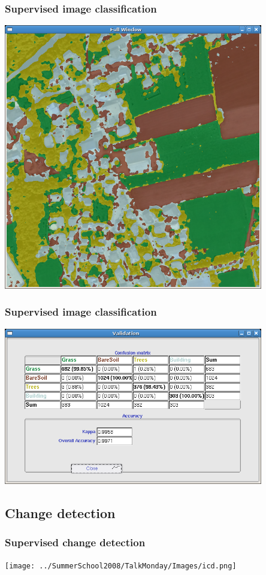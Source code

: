 \documentclass[compress]{beamer}
\begin{document}
\begin{frame}
  \frametitle{Supervised image classification}
      \begin{center}
      \includegraphics[width=0.85\textwidth]{Images/classfResult.png}
  \end{center}
\end{frame}

\begin{frame}
  \frametitle{Supervised image classification}
      \begin{center}
      \includegraphics[width=0.85\textwidth]{Images/classfValid.png}
  \end{center}
\end{frame}


\subsection{Change detection}
\begin{frame}
  \frametitle{Supervised change detection}
      \begin{center}
      \texttt{[image: ../SummerSchool2008/TalkMonday/Images/icd.png]}
  \end{center}
\end{frame}
\end{document}
